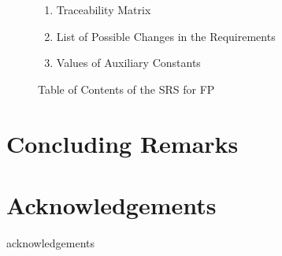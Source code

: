 \documentclass{elsarticle}
\begin{document}
\begin{figure}
{{\begin{minipage}{1.19\textwidth}
\begin{enumerate}
\item{Traceability Matrix}

\item List of Possible Changes in the Requirements

\item{Values of Auxiliary Constants}

\end{enumerate}
\end{minipage}
}
}
\caption{Table of Contents of the SRS for FP}
\label{Fig_TofC_SRS}
\end{figure}



\section{Concluding Remarks} \label{Sec_ConcRemarks}


\section*{Acknowledgements}

acknowledgements




\end{document}
